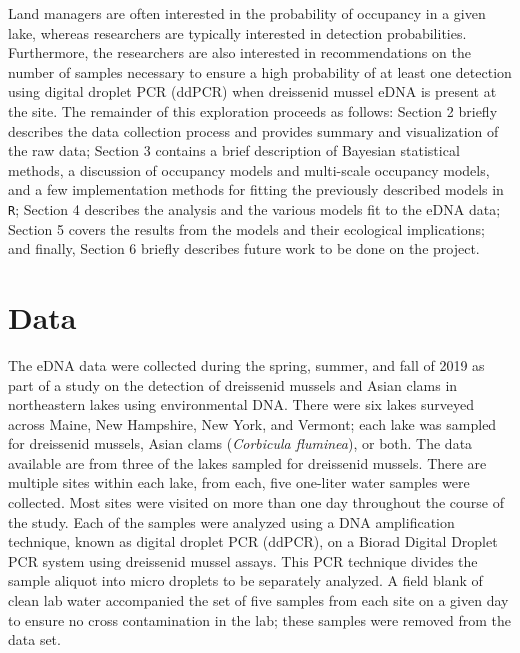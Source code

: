 \documentclass[12pt]{article}\usepackage[]{graphicx}\usepackage[]{color}
\begin{document}
Land managers are often interested in the probability of occupancy in a given lake, whereas researchers are typically interested in detection probabilities. Furthermore, the researchers are also interested in recommendations on the number of samples necessary to ensure a high probability of at least one detection using digital droplet PCR (ddPCR) when dreissenid mussel eDNA is present at the site. The remainder of this exploration proceeds as follows: Section 2 briefly describes the data collection process and provides summary and visualization of the raw data; Section 3 contains a brief description of Bayesian statistical methods, a discussion of occupancy models and multi-scale occupancy models, and a few implementation methods for fitting the previously described models in \texttt{R}; Section 4 describes the analysis and the various models fit to the eDNA data; Section 5 covers the results from the models and their ecological implications; and finally, Section 6 briefly describes future work to be done on the project.

\section{Data}



The eDNA data were collected during the spring, summer, and fall of 2019 as part of a study on the detection of dreissenid mussels and Asian clams in northeastern lakes using environmental DNA. There were six lakes surveyed across Maine, New Hampshire, New York, and Vermont; each lake was sampled for dreissenid mussels, Asian clams (\textit{Corbicula fluminea}), or both. The data available are from three of the lakes sampled for dreissenid mussels. There are multiple sites within each lake, from each, five one-liter water samples were collected. Most sites were visited on more than one day throughout the course of the study. Each of the samples were analyzed using a DNA amplification technique, known as digital droplet PCR (ddPCR), on a Biorad Digital Droplet PCR system using dreissenid mussel assays. This PCR technique divides the sample aliquot into micro droplets to be separately analyzed. A field blank of clean lab water accompanied the set of five samples from each site on a given day to ensure no cross contamination in the lab; these samples were removed from the data set. 
\end{document}
